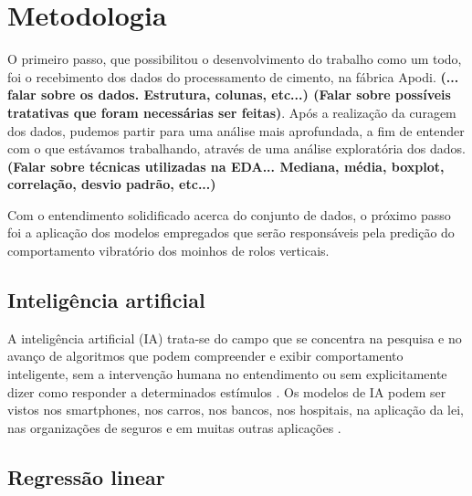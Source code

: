 \chapter{Metodologia}
\label{chap:metodologia}




O primeiro passo, que possibilitou o desenvolvimento do trabalho como um todo, foi o recebimento dos dados do processamento de cimento, na fábrica Apodi. \textbf{(... falar sobre os dados. Estrutura, colunas, etc...) (Falar sobre possíveis tratativas que foram necessárias ser feitas)}. Após a realização da curagem dos dados, pudemos partir para uma análise mais aprofundada, a fim de entender com o que estávamos trabalhando, através de uma análise exploratória dos dados. \textbf{(Falar sobre técnicas utilizadas na EDA... Mediana, média, boxplot, correlação, desvio padrão, etc...)}

Com o entendimento solidificado acerca do conjunto de dados, o próximo passo foi a aplicação dos modelos empregados que serão responsáveis pela predição do comportamento vibratório dos moinhos de rolos verticais.

\section{Inteligência artificial}

A inteligência artificial (IA) trata-se do campo que se concentra na pesquisa e no avanço de algoritmos que podem compreender e exibir comportamento inteligente, sem a intervenção humana no entendimento ou sem explicitamente dizer como responder a determinados estímulos \cite{Dinesh2024}. Os modelos de IA podem ser vistos nos smartphones, nos carros, nos bancos, nos hospitais, na aplicação da lei, nas organizações de seguros e em muitas outras aplicações \cite{Ali2023}.
 
\section{Regressão linear}

